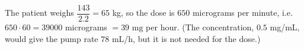 The patient weighs $\dfrac{143}{2.2}=65$ kg, so the dose is $650$ micrograms per minute, i.e. $650\cdot60=39000$ micrograms $=\boxed{39\text{ mg}}$ per hour. (The concentration, $0.5$ mg/mL, would give the pump rate $78$ mL/h, but it is not needed for the dose.)
